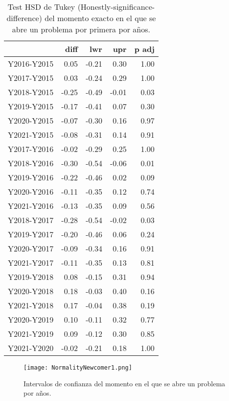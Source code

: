 \begin{table}[H]
\centering
\caption{Test HSD de Tukey (Honestly-significance-difference) del momento exacto en el que se abre un problema por primera por años.}
\label{tab:Tukeynewcomer}
\begin{tabular}{rrrrr}
  \hline
 & diff & lwr & upr & p adj \\ 
  \hline
Y2016-Y2015 & 0.05 & -0.21 & 0.30 & 1.00 \\ 
  Y2017-Y2015 & 0.03 & -0.24 & 0.29 & 1.00 \\ 
  Y2018-Y2015 & -0.25 & -0.49 & -0.01 & 0.03 \\ 
  Y2019-Y2015 & -0.17 & -0.41 & 0.07 & 0.30 \\ 
  Y2020-Y2015 & -0.07 & -0.30 & 0.16 & 0.97 \\ 
  Y2021-Y2015 & -0.08 & -0.31 & 0.14 & 0.91 \\ 
  Y2017-Y2016 & -0.02 & -0.29 & 0.25 & 1.00 \\ 
  Y2018-Y2016 & -0.30 & -0.54 & -0.06 & 0.01 \\ 
  Y2019-Y2016 & -0.22 & -0.46 & 0.02 & 0.09 \\ 
  Y2020-Y2016 & -0.11 & -0.35 & 0.12 & 0.74 \\ 
  Y2021-Y2016 & -0.13 & -0.35 & 0.09 & 0.56 \\ 
  Y2018-Y2017 & -0.28 & -0.54 & -0.02 & 0.03 \\ 
  Y2019-Y2017 & -0.20 & -0.46 & 0.06 & 0.24 \\ 
  Y2020-Y2017 & -0.09 & -0.34 & 0.16 & 0.91 \\ 
  Y2021-Y2017 & -0.11 & -0.35 & 0.13 & 0.81 \\ 
  Y2019-Y2018 & 0.08 & -0.15 & 0.31 & 0.94 \\ 
  Y2020-Y2018 & 0.18 & -0.03 & 0.40 & 0.16 \\ 
  Y2021-Y2018 & 0.17 & -0.04 & 0.38 & 0.19 \\ 
  Y2020-Y2019 & 0.10 & -0.11 & 0.32 & 0.77 \\ 
  Y2021-Y2019 & 0.09 & -0.12 & 0.30 & 0.85 \\ 
  Y2021-Y2020 & -0.02 & -0.21 & 0.18 & 1.00 \\ 
   \hline
\end{tabular}
\end{table}

\begin{figure}[H]
    \centering
    \texttt{[image: NormalityNewcomer1.png]}
    \caption{Intervalos de confianza del momento en el que se abre un problema por años.}
    \label{fig:confidencenewcomer}
\end{figure}


